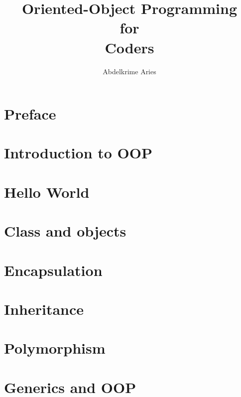 \documentclass{KodeBook}
\title{Oriented-Object Programming\\ for\\ Coders}
\author{Abdelkrime Aries}
\begin{document}
\maketitle



\chapter*{Preface}


\chapter{Introduction to OOP}


\chapter{Hello World}


\chapter{Class and objects}


\chapter{Encapsulation}


\chapter{Inheritance}



\chapter{Polymorphism}


\chapter{Generics and OOP}

\end{document}
